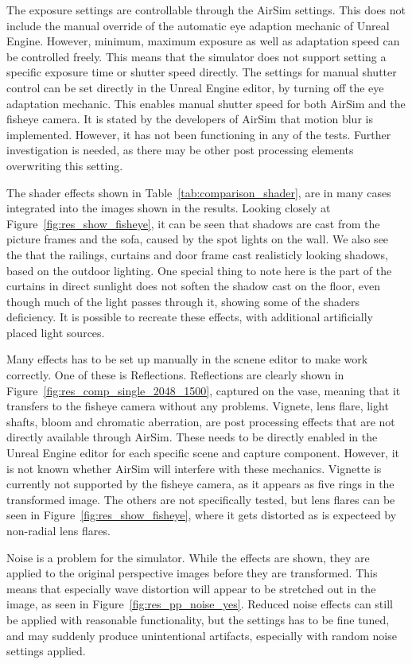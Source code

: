 The exposure settings are controllable through the AirSim settings. This does not include the manual override of the automatic eye adaption mechanic of Unreal Engine. However, minimum, maximum exposure as well as adaptation speed can be controlled freely. This means that the simulator does not support setting a specific exposure time or shutter speed directly. The settings for manual shutter control can be set directly in the Unreal Engine editor, by turning off the eye adaptation mechanic. This enables manual shutter speed for both AirSim and the fisheye camera. It is stated by the developers of AirSim that motion blur is implemented. However, it has not been functioning in any of the tests. Further investigation is needed, as there may be other post processing elements overwriting this setting.

The shader effects shown in Table~\ref{tab:comparison_shader}, are in many cases integrated into the images shown in the results. Looking closely at Figure~\ref{fig:res_show_fisheye}, it can be seen that shadows are cast from the picture frames and the sofa, caused by the spot lights on the wall. We also see the that the railings, curtains and door frame cast realisticly looking shadows, based on the outdoor lighting. One special thing to note here is the part of the curtains in direct sunlight does not soften the shadow cast on the floor, even though much of the light passes through it, showing some of the shaders deficiency. It is possible to recreate these effects, with additional artificially placed light sources.

Many effects has to be set up manually in the scnene editor to make work correctly. One of these is Reflections. Reflections are clearly shown in Figure~\ref{fig:res_comp_single_2048_1500}, captured on the vase, meaning that it transfers to the fisheye camera without any problems. Vignete, lens flare, light shafts, bloom and chromatic aberration, are post processing effects that are not directly available through AirSim. These needs to be directly enabled in the Unreal Engine editor for each specific scene and capture component. However, it is not known whether AirSim will interfere with these mechanics. Vignette is currently not supported by the fisheye camera, as it appears as five rings in the transformed image. The others are not specifically tested, but lens flares can be seen in Figure~\ref{fig:res_show_fisheye}, where it gets distorted as is expecteed by non-radial lens flares.

Noise is a problem for the simulator. While the effects are shown, they are applied to the original perspective images before they are transformed. This means that especially wave distortion will appear to be stretched out in the image, as seen in Figure~\ref{fig:res_pp_noise_yes}. Reduced noise effects can still be applied with reasonable functionality, but the settings has to be fine tuned, and may suddenly produce unintentional artifacts, especially with random noise settings applied.

